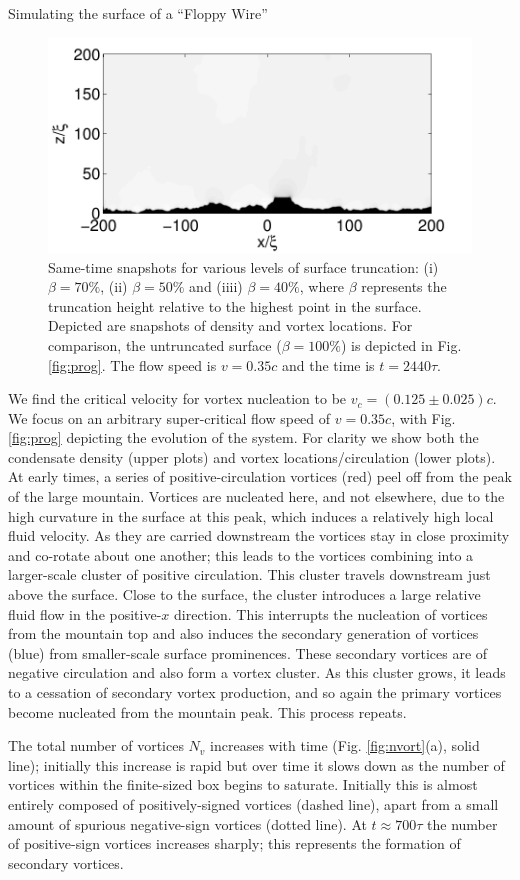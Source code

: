 \begin{chapter}{\label{cha:afm}Simulating the surface of a ``Floppy Wire''}
\begin{figure}
\includegraphics[width=0.35\linewidth]{./afm/figures/10th-35-2440}
\caption{\label{fig:trunc} Same-time snapshots for various levels of surface truncation: (i) $\beta=70\%$, (ii) $\beta=50\%$ and (iiii) $\beta=40\%$, where $\beta$ represents the truncation height relative to the highest point in the surface. Depicted are snapshots of density and vortex locations. For comparison, the untruncated surface ($\beta=100\%$) is depicted in Fig. \ref{fig:prog}.  The flow speed is $v=0.35c$ and the time is $t=2440\tau$.}
\end{figure}
We find the critical velocity for vortex nucleation to be $v_c=(0.125\pm0.025) c$. We focus on an arbitrary super-critical flow speed of $v=0.35c$, with Fig. \ref{fig:prog} depicting the evolution of the system.  For clarity we show both the condensate density (upper plots) and vortex locations/circulation (lower plots).  At early times, a series of positive-circulation vortices (red) peel off from the peak of the large mountain. Vortices are nucleated here, and not elsewhere, due to the high curvature in the surface at this peak, which induces a relatively high local fluid velocity.  As they are carried downstream the vortices stay in close proximity and co-rotate about one another; this leads to the vortices combining into a larger-scale cluster of positive circulation.  This cluster travels downstream just above the surface.  Close to the surface, the cluster introduces a large relative fluid flow in the positive-$x$ direction.  This interrupts the nucleation of vortices from the mountain top and also induces the secondary generation of vortices (blue) from smaller-scale surface prominences.  These secondary vortices are of negative circulation and also form a vortex cluster. As this cluster grows, it leads to a cessation of secondary vortex production, and so again the primary vortices become nucleated from the mountain peak.  This process repeats.

The total number of vortices $N_v$ increases with time (Fig. \ref{fig:nvort}(a), solid line); initially this increase is rapid but over time it slows down as the number of vortices within the finite-sized box begins to saturate.  Initially this is almost entirely composed of positively-signed vortices (dashed line), apart from a small amount of spurious negative-sign vortices (dotted line).  At $t\approx 700 \tau$ the number of positive-sign vortices increases sharply; this represents the formation of secondary vortices. 


\end{chapter}
